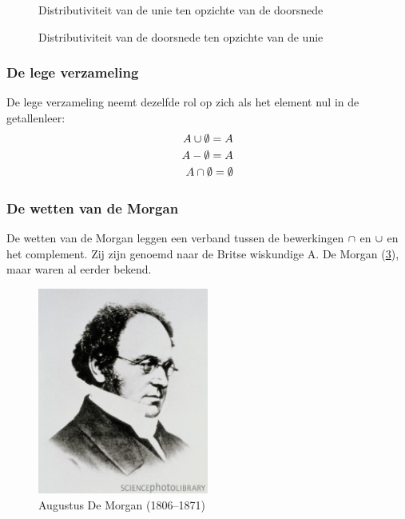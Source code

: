 \begin{figure}[htbp]
\centering
{}\qquad
{}
\caption{Distributiviteit van de unie ten opzichte van de doorsnede}
\label{fig:distr1}
\end{figure}

\begin{figure}
\centering
{}\qquad
{}
\caption{Distributiviteit van de doorsnede ten opzichte van de unie}
\label{fig:distr2}
\end{figure}

\subsubsection{De lege verzameling}
De lege verzameling neemt dezelfde rol op zich als het element nul in de getallenleer:
\begin{equation*}
\begin{split}
A\cup \emptyset=A \\
A-\emptyset=A\\
A\cap\emptyset=\emptyset 
\end{split}
\end{equation*}

\subsubsection{De wetten van de Morgan}
De wetten van de Morgan leggen een verband tussen de 
bewerkingen $\cap$ en $\cup$ en het complement. 
Zij zijn genoemd naar de Britse wiskundige A. De Morgan 
(\cref{fig:morgan}), maar waren al eerder bekend.
\begin{figure}[htbp]
\centering
\includegraphics[width=0.5\textwidth]{figuren/verzamelingen_relaties/AugustusDeMorgan}
\caption{Augustus De Morgan (1806--1871)}
\label{fig:morgan}
\end{figure}

